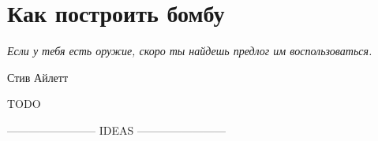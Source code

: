 \chapter{Как построить бомбу}\label{how_to_build_bomb}

\epigraph{\emph{Если у тебя есть оружие, \break скоро ты найдешь предлог им воспользоваться.}}{Стив Айлетт}

TODO

------------------------ IDEAS ------------------------ 

